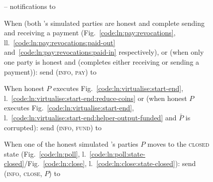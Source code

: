 \begin{figure}[H]
\begin{simulatorbox}{\simulator{} -- notifications to \fchan}
\begin{algorithmic}[1]
      \State When (both \fchan's simulated parties are honest and complete
      sending and receiving a payment (Fig.~\ref{code:ln:pay:revocations},
      ll.~\ref{code:ln:pay:revocations:paid-out}
      and~\ref{code:ln:pay:revocations:paid-in} respectively), or (when only one
      party is honest and (completes either receiving or sending a payment)):
      \label{code:simulator:when-pay}
      \Indent
        \State send (\textsc{info}, \textsc{pay}) to \fchan
      \EndIndent
      \Statex

      \State When honest $P$ executes Fig.~\ref{code:ln:virtualise:start-end},
      l.~\ref{code:ln:virtualise:start-end:reduce-coins} or (when honest $P$
      executes Fig.~\ref{code:ln:virtualise:start-end},
      l.~\ref{code:ln:virtualise:start-end:helper-output-funded} and $\bar{P}$
      is corrupted): 
      \label{code:simulator:when-fund}
      \Indent
        \State send (\textsc{info}, \textsc{fund}) to \fchan
      \EndIndent
      \Statex

      \State When one of the honest simulated \fchan's parties $P$ moves to the
      \textsc{closed} state (Fig.~\ref{code:ln:poll},
      l.~\ref{code:ln:poll:state-closed}/Fig.~\ref{code:ln:close},
      l.~\ref{code:ln:close:state-closed}):
      \Indent
        \State send (\textsc{info}, \textsc{close}, $P$) to \fchan
      \EndIndent
    \end{algorithmic}
  \end{simulatorbox}
  \caption{}
  \label{code:simulator}
\end{figure}
